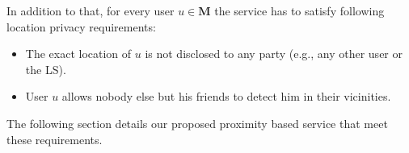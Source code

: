 In addition to that, for every user $u \in \mathbf{M}$ the service has to
satisfy following location privacy requirements:
\begin{itemize}
 \item The exact location of $u$ is not disclosed to any party (e.g., any other
user or the LS).
 \item User $u$ allows nobody else but his friends to detect him in
their vicinities.
\end{itemize}

The following section details our proposed proximity based service that
meet these requirements.